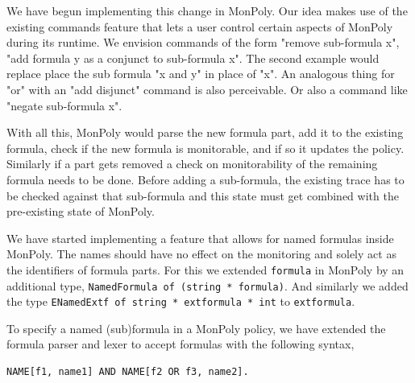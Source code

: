 We have begun implementing this change in MonPoly.
Our idea makes use of the existing commands feature that lets a user control certain aspects of MonPoly during its runtime.
We envision commands of the form "remove sub-formula x", "add formula y as a conjunct to sub-formula x".
The second example would replace place the sub formula "x and y" in place of "x".
An analogous thing for "or" with an "add disjunct" command is also perceivable.
Or also a command like "negate sub-formula x".

With all this, MonPoly would parse the new formula part, add it to the existing formula, check if the new formula is monitorable, and if so it updates the policy.
Similarly if a part gets removed a check on monitorability of the remaining formula needs to be done.
Before adding a sub-formula, the existing trace has to be checked against that sub-formula and this state must get combined with the pre-existing state of MonPoly.

We have started implementing a feature that allows for named formulas inside MonPoly.
The names should have no effect on the monitoring and solely act as the identifiers of formula parts.
For this we extended \texttt{formula} in MonPoly by an additional type, \texttt{NamedFormula of (string * formula)}.
And similarly we added the type \texttt{ENamedExtf of string * extformula * int} to \texttt{extformula}.

To specify a named (sub)formula in a MonPoly policy, we have extended the formula parser and lexer to accept formulas with the following syntax,
\begin{verbatim}
NAME[f1, name1] AND NAME[f2 OR f3, name2].
\end{verbatim}

